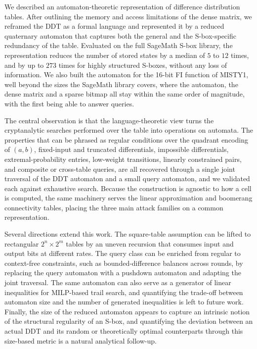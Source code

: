 \documentclass[runningheads]{llncs}
\begin{document}
We described an automaton-theoretic representation of difference distribution
tables. After outlining the memory and access limitations of the dense matrix, we
reframed the DDT as a formal language and represented it by a reduced quaternary
automaton that captures both the general and the S-box-specific redundancy of the
table. Evaluated on the full SageMath S-box library, the representation reduces
the number of stored states by a median of $5$ to $12$ times, and by up to
$273$ times for highly structured S-boxes, without any loss of information. We also built the automaton for the 16-bit FI function of MISTY1, well beyond the sizes the SageMath library covers, where the automaton, the dense matrix and a sparse bitmap all stay within the same order of magnitude, with the first being able to answer queries.

The central observation is that the language-theoretic
view turns the cryptanalytic searches performed over the table into operations on
automata. The properties that can be phrased as regular conditions over the
quadrant encoding of $(a,b)$, fixed-input and truncated differentials, impossible
differentials, extremal-probability entries, low-weight transitions, linearly
constrained pairs, and composite or cross-table queries, are all recovered
through a single joint traversal of the DDT automaton and a small query automaton,
and we validated each against exhaustive search. Because the construction is
agnostic to how a cell is computed, the same machinery serves the linear
approximation and boomerang connectivity tables, placing the three main attack
families on a common representation.

Several directions extend this work. The square-table assumption can be lifted to
rectangular $2^{n}\times 2^{m}$ tables by an uneven recursion that consumes input
and output bits at different rates. The query class can be enriched from regular to
context-free constraints, such as bounded-difference balances across rounds, by
replacing the query automaton with a pushdown automaton and adapting the joint
traversal. The same automaton can also serve as a generator of linear inequalities
for MILP-based trail search, and quantifying the trade-off between automaton size
and the number of generated inequalities is left to future work. Finally, the size
of the reduced automaton appears to capture an intrinsic notion of the structural
regularity of an S-box, and quantifying the deviation between an actual DDT and
its random or theoretically optimal counterparts through this size-based metric
is a natural analytical follow-up.



\end{document}
